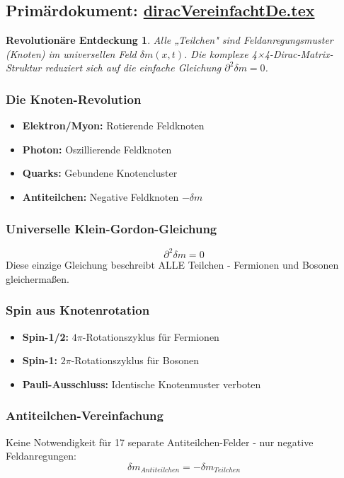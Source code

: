 \documentclass[12pt,a4paper]{report}
\newtheorem{discovery}{Revolutionäre Entdeckung}[chapter]
\begin{document}
	\subsection{Primärdokument: \href{https://github.com/jpascher/T0-Time-Mass-Duality/tree/main/2/pdf/diracVereinfachtDe.pdf}{diracVereinfachtDe.tex}}
	
	\begin{discovery}
		Alle „Teilchen" sind Feldanregungsmuster (Knoten) im universellen Feld $\delta m(x,t)$. Die komplexe 4×4-Dirac-Matrix-Struktur reduziert sich auf die einfache Gleichung $\partial^2 \delta m = 0$.
	\end{discovery}
	
	\subsubsection{Die Knoten-Revolution}
	\begin{itemize}
		\item \textbf{Elektron/Myon:} Rotierende Feldknoten
		\item \textbf{Photon:} Oszillierende Feldknoten
		\item \textbf{Quarks:} Gebundene Knotencluster
		\item \textbf{Antiteilchen:} Negative Feldknoten $-\delta m$
	\end{itemize}
	
	\subsubsection{Universelle Klein-Gordon-Gleichung}
	$$\partial^2 \delta m = 0$$
	Diese einzige Gleichung beschreibt ALLE Teilchen - Fermionen und Bosonen gleichermaßen.
	
	\subsubsection{Spin aus Knotenrotation}
	\begin{itemize}
		\item \textbf{Spin-1/2:} $4\pi$-Rotationszyklus für Fermionen
		\item \textbf{Spin-1:} $2\pi$-Rotationszyklus für Bosonen
		\item \textbf{Pauli-Ausschluss:} Identische Knotenmuster verboten
	\end{itemize}
	
	\subsubsection{Antiteilchen-Vereinfachung}
	Keine Notwendigkeit für 17 separate Antiteilchen-Felder - nur negative Feldanregungen:
	$$\delta m_{Antiteilchen} = -\delta m_{Teilchen}$$
	
\end{document}
